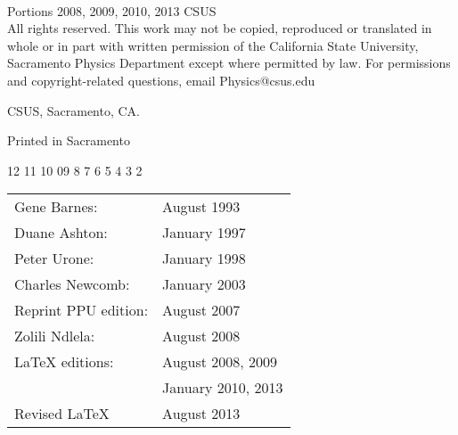 
\begin{fullwidth}
\thispagestyle{empty}
~\vfill

\setlength{\parindent}{0pt}
\setlength{\parskip}{\baselineskip}

Portions \textcopyright{} 2008, 2009, 2010, 2013 CSUS \\
All rights reserved.  This work may not be copied, reproduced or translated in whole or in part with written permission of the California State University, Sacramento Physics Department except where permitted by law.  For permissions and copyright-related questions, email Physics@csus.edu

CSUS, Sacramento, CA.

Printed in Sacramento 


\begin{center}
12 11 10 09  \hspace{2em}8 7 6 5 4 3 2       
\end{center}
\begin{center}
\begin{tabular}{ll}
Gene Barnes:						& August 1993 \\
Duane Ashton:					& January 1997 \\
Peter Urone:						& January 1998 \\
Charles Newcomb:              	& January 2003 \\
Reprint PPU edition:				& August 2007 \\
Zolili Ndlela:					& August 2008 \\
{\LaTeX} editions:				& August 2008, 2009\\
								& January 2010, 2013 \\
Revised {\LaTeX}					& August 2013\\

\end{tabular}
\end{center}
\end{fullwidth}

\clearpage